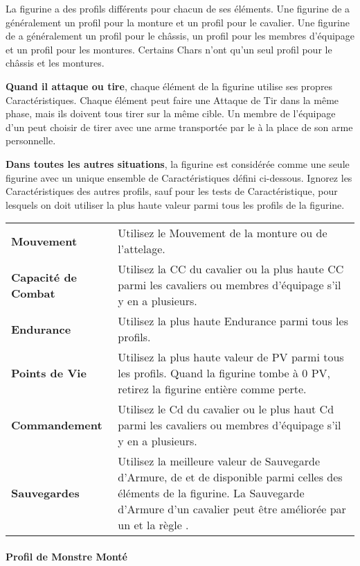 La figurine a des profils différents pour chacun de ses éléments. Une figurine de \cavalry{} a généralement un profil pour la monture et un profil pour le cavalier. Une figurine de \chariot{} a généralement un profil pour le châssis, un profil pour les membres d'équipage et un profil pour les montures. Certains Chars n'ont qu'un seul profil pour le châssis et les montures.

\textbf{Quand il attaque ou tire}, chaque élément de la figurine utilise ses propres Caractéristiques. Chaque élément peut faire une Attaque de Tir dans la même phase, mais ils doivent tous tirer sur la même cible. Un membre de l'équipage d'un \chariot{} peut choisir de tirer avec une arme transportée par le \chariot{} à la place de son arme personnelle.

\textbf{Dans toutes les autres situations}, la figurine est considérée comme une seule figurine avec un unique ensemble de Caractéristiques défini ci-dessous. Ignorez les Caractéristiques des autres profils, sauf pour les tests de Caractéristique, pour lesquels on doit utiliser la plus haute valeur parmi tous les profils de la figurine.

\vspace*{10pt}
\renewcommand{\arraystretch}{2.5}
\begin{center}
\begin{tabular}{>{\bfseries\raggedleft}p{3cm}p{12cm}}
\hline
Mouvement & Utilisez le Mouvement de la monture ou de l'attelage. \tabularnewline
Capacité de Combat & Utilisez la CC du cavalier ou la plus haute CC parmi les cavaliers ou membres d'équipage s'il y en a plusieurs. \tabularnewline
Endurance & Utilisez la plus haute Endurance parmi tous les profils. \tabularnewline
Points de Vie & Utilisez la plus haute valeur de PV parmi tous les profils. Quand la figurine tombe à 0 PV, retirez la figurine entière comme perte. \tabularnewline
Commandement & Utilisez le Cd du cavalier ou le plus haut Cd parmi les cavaliers ou membres d'équipage s'il y en a plusieurs. \tabularnewline
Sauvegardes & Utilisez la meilleure valeur de Sauvegarde d'Armure, de \regeneration{} et de \wardsave{} disponible parmi celles des éléments de la figurine. La Sauvegarde d'Armure d'un cavalier peut être améliorée par un \barding{} et la règle \mountsprotection{}. \tabularnewline
\hline
\end{tabular}\end{center}
\renewcommand{\arraystretch}{1.5}

\newpage
\paragraph{Profil de Monstre Monté}
\label{ridden_monster_profile}

